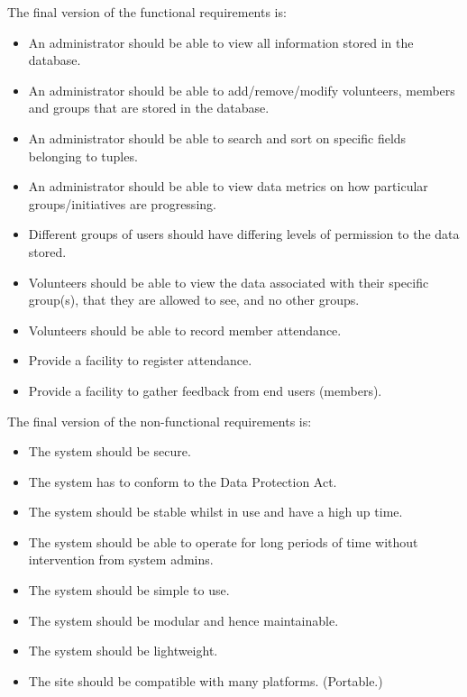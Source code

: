 \documentclass{l3proj}
\begin{document}
The final version of the functional requirements is:
\begin{itemize}

\item An administrator should be able to view all information stored in the database.

\item An administrator should be able to add/remove/modify volunteers, members and groups that are stored in the database.

\item An administrator should be able to search and sort on specific fields belonging to tuples.

\item An administrator should be able to view data metrics on how particular groups/initiatives are progressing.

\item Different groups of users should have differing levels of permission to the data stored.

\item Volunteers should be able to view the data associated with their specific group(s), that they are allowed to see, and no other groups.

\item Volunteers should be able to record member attendance.

\item Provide a facility to register attendance.

\item Provide a facility to gather feedback from end users (members).

\end{itemize}

The final version of the non-functional requirements is:

\begin{itemize}

\item The system should be secure.

\item The system has to conform to the Data Protection Act.

\item The system should be stable whilst in use and have a high up time.

\item The system should be able to operate for long periods of time without intervention from system admins.

\item The system should be simple to use.

\item The system should be modular and hence maintainable.

\item The system should be lightweight.

\item The site should be compatible with many platforms. (Portable.)

\end{itemize}
\end{document}
